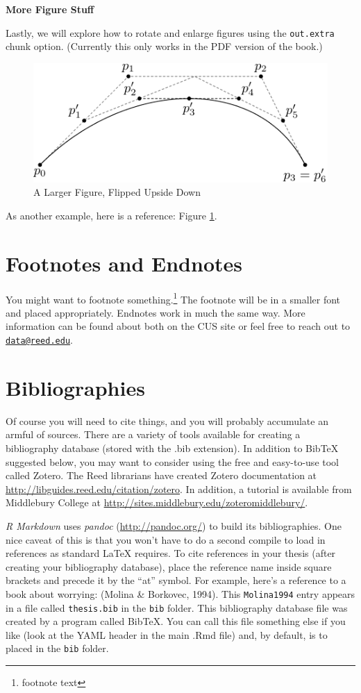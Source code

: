 \documentclass [11pt, proquest] {uwthesis}[2015/03/03]
\begin{document}
\textbf{More Figure Stuff}

Lastly, we will explore how to rotate and enlarge figures using the
\texttt{out.extra} chunk option. (Currently this only works in the PDF
version of the book.)
\begin{figure}
\includegraphics[angle=180, scale=1.1]{figure/subdivision} \caption{A Larger Figure, Flipped Upside Down}\label{fig:subd2}
\end{figure}
As another example, here is a reference: Figure \ref{fig:subd2}.

\section{Footnotes and Endnotes}\label{footnotes-and-endnotes}

You might want to footnote something.\footnote{footnote text} The
footnote will be in a smaller font and placed appropriately. Endnotes
work in much the same way. More information can be found about both on
the CUS site or feel free to reach out to
\href{mailto:data@reed.edu}{\nolinkurl{data@reed.edu}}.

\section{Bibliographies}\label{bibliographies}

Of course you will need to cite things, and you will probably accumulate
an armful of sources. There are a variety of tools available for
creating a bibliography database (stored with the .bib extension). In
addition to BibTeX suggested below, you may want to consider using the
free and easy-to-use tool called Zotero. The Reed librarians have
created Zotero documentation at
\url{http://libguides.reed.edu/citation/zotero}. In addition, a tutorial
is available from Middlebury College at
\url{http://sites.middlebury.edu/zoteromiddlebury/}.

\emph{R Markdown} uses \emph{pandoc} (\url{http://pandoc.org/}) to build
its bibliographies. One nice caveat of this is that you won't have to do
a second compile to load in references as standard LaTeX requires. To
cite references in your thesis (after creating your bibliography
database), place the reference name inside square brackets and precede
it by the ``at'' symbol. For example, here's a reference to a book about
worrying: (Molina \& Borkovec, 1994). This \texttt{Molina1994} entry
appears in a file called \texttt{thesis.bib} in the \texttt{bib} folder.
This bibliography database file was created by a program called BibTeX.
You can call this file something else if you like (look at the YAML
header in the main .Rmd file) and, by default, is to placed in the
\texttt{bib} folder.
\end{document}

